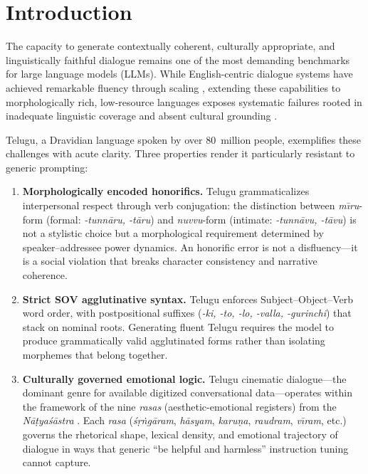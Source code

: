 \documentclass[11pt]{article}
\begin{document}
\section{Introduction}
\label{sec:introduction}

The capacity to generate contextually coherent, culturally appropriate, and linguistically faithful dialogue remains one of the most demanding benchmarks for large language models (LLMs). While English-centric dialogue systems have achieved remarkable fluency through scaling \citep{brown-etal-2020-language, zhang-etal-2019-dialogpt}, extending these capabilities to morphologically rich, low-resource languages exposes systematic failures rooted in inadequate linguistic coverage and absent cultural grounding \citep{joshi-etal-2020-state}.

Telugu, a Dravidian language spoken by over 80~million people, exemplifies these challenges with acute clarity. Three properties render it particularly resistant to generic prompting:

\begin{enumerate}[leftmargin=*,itemsep=2pt]
    \item \textbf{Morphologically encoded honorifics.} Telugu grammaticalizes interpersonal respect through verb conjugation: the distinction between \textit{m\={\i}ru}-form (formal: \textit{-tunn\=aru, -t\=aru}) and \textit{nuvvu}-form (intimate: \textit{-tunn\=avu, -t\=avu}) is not a stylistic choice but a morphological requirement determined by speaker--addressee power dynamics. An honorific error is not a disfluency---it is a social violation that breaks character consistency and narrative coherence.
    
    \item \textbf{Strict SOV agglutinative syntax.} Telugu enforces Subject--Object--Verb word order, with postpositional suffixes (\textit{-ki, -to, -lo, -valla, -gurinchi}) that stack on nominal roots. Generating fluent Telugu requires the model to produce grammatically valid agglutinated forms rather than isolating morphemes that belong together.
    
    \item \textbf{Culturally governed emotional logic.} Telugu cinematic dialogue---the dominant genre for available digitized conversational data---operates within the framework of the nine \textit{rasas} (aesthetic-emotional registers) from the \textit{N\=a\d{t}ya\'{s}\=astra} \citep{natyashastra}. Each \textit{rasa} (\textit{\'{s}\d{r}\.{n}g\=aram}, \textit{h\=asyam}, \textit{karu\d{n}a}, \textit{raudram}, \textit{v\={\i}ram}, etc.) governs the rhetorical shape, lexical density, and emotional trajectory of dialogue in ways that generic ``be helpful and harmless'' instruction tuning cannot capture.
\end{enumerate}
\end{document}
